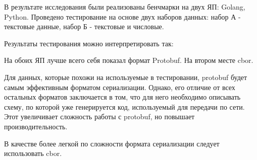 В результате исследования были реализованы бенчмарки на двух ЯП: Golang, Python.  
Проведено тестирование на основе двух наборов данных: набор А - текстовые данные, набор Б - текстовые и числовые.  

Результаты тестирования можно интерпретировать так:   

На обоих ЯП лучше всего себя показал формат Protobuf. На втором месте cbor.  

Для данных, которые похожи на используемые в тестировании, protobuf будет самым эффективным форматом сериализации. Однако, его отличие от всех остальных форматов заключается в том, что для него необходимо описывать схему, по которой уже генерируется код, используемый для передачи по сети.   
Этот увеличивает сложность работы с protobuf, но повышает производительность.  

В качестве более легкой по сложности формата сериализации следует использовать cbor. 


